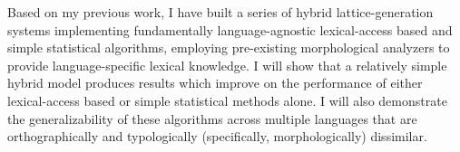 Based on my previous work, I have built a series of hybrid lattice-generation systems implementing fundamentally language-agnostic lexical-access based and simple statistical algorithms, employing pre-existing morphological analyzers to provide language-specific lexical knowledge. I will show that a relatively simple hybrid model produces results which improve on the performance of either lexical-access based or simple statistical methods alone. I will also demonstrate the generalizability of these algorithms across multiple languages that are orthographically and typologically (specifically, morphologically) dissimilar.